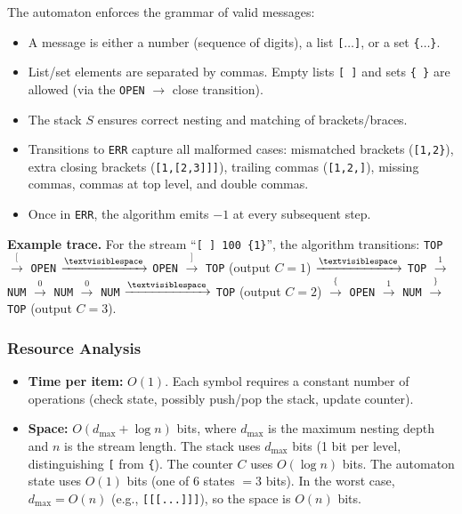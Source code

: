 \documentclass[11pt]{article}
\begin{document}
The automaton enforces the grammar of valid messages:
\begin{itemize}
\item A message is either a number (sequence of digits), a list \texttt{[$\ldots$]}, or a set \texttt{\{$\ldots$\}}.
\item List/set elements are separated by commas. Empty lists \texttt{[\,]} and sets \texttt{\{\,\}} are allowed (via the \texttt{OPEN} $\to$ close transition).
\item The stack $S$ ensures correct nesting and matching of brackets/braces.
\item Transitions to \texttt{ERR} capture all malformed cases: mismatched brackets (\texttt{[1,2\}}), extra closing brackets (\texttt{[1,[2,3]]]}), trailing commas (\texttt{[1,2,]}), missing commas, commas at top level, and double commas.
\item Once in \texttt{ERR}, the algorithm emits $-1$ at every subsequent step.
\end{itemize}

\textbf{Example trace.} For the stream ``\texttt{[ ] 100 \{1\}}'', the algorithm transitions: \texttt{TOP} $\xrightarrow{[}$ \texttt{OPEN} $\xrightarrow{\textvisiblespace}$ \texttt{OPEN} $\xrightarrow{]}$ \texttt{TOP} (output $C\!=\!1$) $\xrightarrow{\textvisiblespace}$ \texttt{TOP} $\xrightarrow{1}$ \texttt{NUM} $\xrightarrow{0}$ \texttt{NUM} $\xrightarrow{0}$ \texttt{NUM} $\xrightarrow{\textvisiblespace}$ \texttt{TOP} (output $C\!=\!2$) $\xrightarrow{\{}$ \texttt{OPEN} $\xrightarrow{1}$ \texttt{NUM} $\xrightarrow{\}}$ \texttt{TOP} (output $C\!=\!3$).

\subsubsection*{Resource Analysis}

\begin{itemize}
\item \textbf{Time per item:} $O(1)$. Each symbol requires a constant number of operations (check state, possibly push/pop the stack, update counter).
\item \textbf{Space:} $O(d_{\max} + \log n)$ bits, where $d_{\max}$ is the maximum nesting depth and $n$ is the stream length. The stack uses $d_{\max}$ bits (1 bit per level, distinguishing \texttt{[} from \texttt{\{}). The counter $C$ uses $O(\log n)$ bits. The automaton state uses $O(1)$ bits (one of 6 states $= 3$ bits). In the worst case, $d_{\max} = O(n)$ (e.g., \texttt{[[[...]]]}), so the space is $O(n)$ bits.
\end{itemize}
\end{document}
